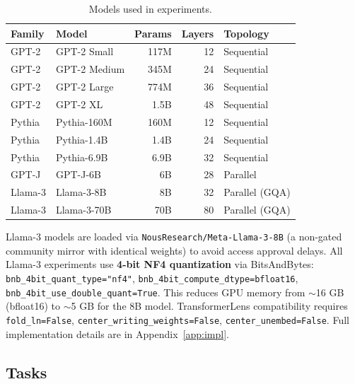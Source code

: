 \documentclass{article}
\begin{document}
\begin{table}[h]
  \centering
  \caption{Models used in experiments.}
  \label{tab:models}
  \begin{tabular}{llrrl}
    \toprule
    Family & Model & Params & Layers & Topology \\
    \midrule
    GPT-2    & GPT-2 Small       &  117M  & 12 & Sequential \\
    GPT-2    & GPT-2 Medium      &  345M  & 24 & Sequential \\
    GPT-2    & GPT-2 Large       &  774M  & 36 & Sequential \\
    GPT-2    & GPT-2 XL          & 1.5B   & 48 & Sequential \\
    Pythia   & Pythia-160M       &  160M  & 12 & Sequential \\
    Pythia   & Pythia-1.4B       &  1.4B  & 24 & Sequential \\
    Pythia   & Pythia-6.9B       &  6.9B  & 32 & Sequential \\
    GPT-J    & GPT-J-6B          &  6B    & 28 & Parallel   \\
    Llama-3  & Llama-3-8B        &  8B    & 32 & Parallel (GQA) \\
    Llama-3  & Llama-3-70B       & 70B    & 80 & Parallel (GQA) \\
    \bottomrule
  \end{tabular}
\end{table}

Llama-3 models are loaded via \texttt{NousResearch/Meta-Llama-3-8B} (a non-gated
community mirror with identical weights) to avoid access approval delays.
All Llama-3 experiments use \textbf{4-bit NF4 quantization} via BitsAndBytes:
\texttt{bnb\_4bit\_quant\_type="nf4"}, \texttt{bnb\_4bit\_compute\_dtype=bfloat16},
\texttt{bnb\_4bit\_use\_double\_quant=True}.
This reduces GPU memory from $\sim$16 GB (bfloat16) to $\sim$5 GB for the 8B model.
TransformerLens compatibility requires \texttt{fold\_ln=False},
\texttt{center\_writing\_weights=False}, \texttt{center\_unembed=False}.
Full implementation details are in Appendix~\ref{app:impl}.

\subsection{Tasks}
\label{sec:tasks}
\end{document}
